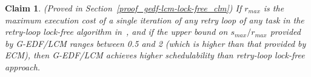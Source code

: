\documentclass[conference]{sig-alternate}
\newtheorem{clm}{Claim}
\begin{document}
\begin{clm}\label{gedf-lcm-lock-free_clm}
(Proved in Section~\ref{proof_gedf-lcm-lock-free_clm}) If $r_{max}$ is the maximum execution cost of a single iteration of any retry loop of any task in the retry-loop lock-free algorithm in~\cite{key-5}, and if the upper bound on $s_{max}/r_{max}$ provided by G-EDF/LCM ranges between 0.5 and 2 (which is higher than that provided by ECM), then G-EDF/LCM achieves higher schedulability than retry-loop lock-free approach.
\end{clm}
%

\end{document}
